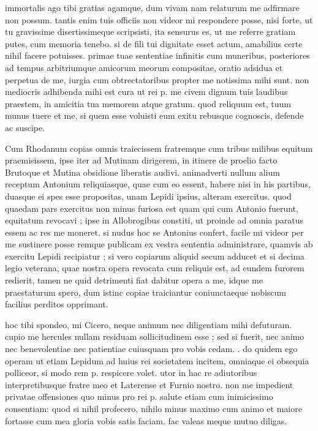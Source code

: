 


 immortalis ago tibi gratias agamque, dum vivam nam relaturum me adfirmare non possum. tantis enim tuis officiis non videor mi respondere posse, nisi forte, ut tu gravissime disertissimeque scripsisti, ita sensurus es, ut me referre gratiam putes, cum memoria tenebo. si de fili tui dignitate esset actum, amabilius certe nihil facere potuisses. primae tuae sententiae infinitis cum muneribus, posteriores ad tempus arbitriumque amicorum meorum compositae, oratio adsidua et perpetua de me, iurgia cum obtrectatoribus propter me notissima mihi sunt. non mediocris adhibenda mihi est cura ut rei p. me civem dignum tuis laudibus praestem, in amicitia tua memorem atque gratum. quod reliquum est, tuum munus tuere et me, si quem esse voluisti eum exitu rebusque cognoscis, defende ac suscipe.

 Cum Rhodanum copias omnis traiecissem fratremque cum tribus milibus equitum praemisissem, ipse iter ad Mutinam dirigerem, in itinere de proelio facto Brutoque et Mutina obsidione liberatis audivi. animadverti nullum alium receptum Antonium reliquiasque, quae cum eo essent, habere nisi in his partibus, duasque ei spes esse propositas, unam Lepidi ipsius, alteram exercitus. quod quaedam pars exercitus non minus furiosa est quam qui cum Antonio fuerunt, equitatum revocavi ; ipse in Allobrogibus constiti, ut proinde ad omnia paratus essem ac res me moneret. si nudus hoc se Antonius confert, facile mi videor per me sustinere posse remque publicam ex vestra sententia administrare, quamvis ab exercitu Lepidi recipiatur ; si vero copiarum aliquid secum adducet et si decima legio veterana, quae nostra opera revocata cum reliquis est, ad eundem furorem redierit, tamen ne quid detrimenti fiat dabitur opera a me, idque me praestaturum spero, dum istinc copiae traiciantur coniunctaeque nobiscum facilius perditos opprimant.

 hoc tibi spondeo, mi Cicero, neque animum nec diligentiam mihi defuturam. cupio me hercules nullam residuam sollicitudinem esse ; sed si fuerit, nec animo nec benevolentiae nec patientiae cuiusquam pro vobis cedam. . do quidem ego operam ut etiam Lepidum ad huius rei societatem incitem, omniaque ei obsequia polliceor, si modo rem p. respicere volet. utor in hac re adiutoribus interpretibusque fratre meo et Laterense et Furnio nostro. non me impedient privatae offensiones quo minus pro rei p. salute etiam cum inimicissimo consentiam: quod si nihil profecero, nihilo minus maximo cum animo et maiore fortasse cum mea gloria vobis satis faciam. fac valeas meque mutuo diligas.
